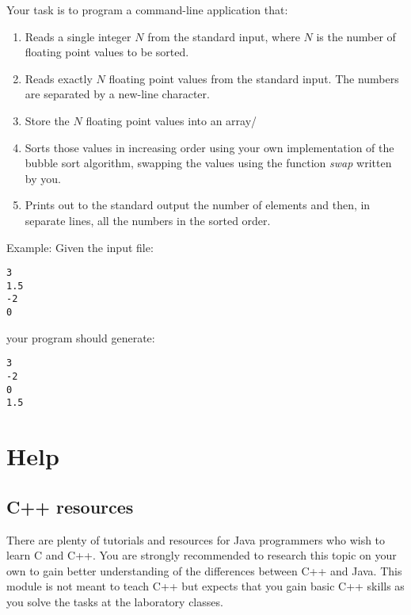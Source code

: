Your task is to program a command-line application that:
\begin{enumerate}
	\item Reads a single integer $N$ from the standard input, where $N$ is the number of floating point values to be sorted. 
	\item Reads exactly $N$ floating point values from the standard input. The numbers are separated by a new-line character.
	\item Store the $N$ floating point values into an array/
	\item Sorts those values in increasing order using your own implementation of the bubble sort algorithm, swapping the values using the function \emph{swap} written by you. 
	\item Prints out to the standard output the number of elements and then, in separate lines, all the numbers in the sorted order.
\end{enumerate}


Example: Given the input file:
\begin{verbatim}
3
1.5
-2
0
\end{verbatim}
your program should generate:
\begin{verbatim}
3
-2
0
1.5
\end{verbatim}



\section*{Help}


\subsection*{C++ resources}

There are plenty of tutorials and resources for Java programmers who wish
to learn C and C++. You are strongly recommended to research this
topic on your own to gain better understanding of the differences
between C++ and Java. This module is not meant to teach C++ but
expects that you gain basic C++ skills as you solve the tasks at the
laboratory classes.

